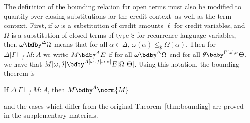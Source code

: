 The definition of the bounding relation for open terms must also be modified to quantify over closing substitutions for the credit context, as well as the term context.
First, if $\omega$ is a substitution of credit amounts $\ell$ for credit variables, and $\Omega$ is a substitution of closed terms of type $\$$ for recurrence language variables, then $\omega \bdby^{\Delta} \Omega$ means that for all $\alpha \in \Delta$, $\omega(\alpha) \leq_\$ \Omega(\alpha)$.
Then for $\Delta | \Gamma \vdash_f M : A$ we write $M \bdby^A E$ if for all $\omega \bdby^{\Delta} \Omega$ and for all $\theta \bdby^{\Gamma[\omega],\sigma} \Theta$, we have that $M[\omega,\theta] \bdby^{A[\omega],f[\omega,\sigma]} E[\Omega,\Theta]$.
Using this notation, the bounding theorem is
\begin{theorem}
\label{thm:bounding-ex}
If $\Delta | \Gamma \vdash_f M : A$, then $M \bdby^A \norm{M}$
\end{theorem}
\noindent and the cases which differ from the original Theorem~\ref{thm:bounding} are proved in the supplementary materials.


